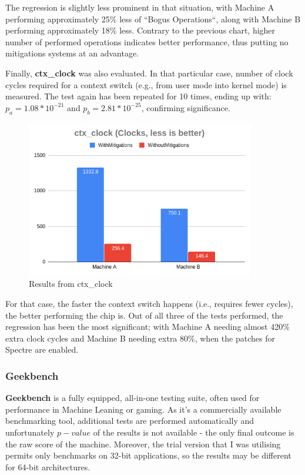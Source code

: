 \documentclass{csfourzero}
\begin{document}
The regression is slightly less prominent in that situation, with Machine A performing approximately 25\% less of ``Bogus Operations``, along with Machine B performing approximately 18\% less. Contrary to the previous chart, higher number of performed operations indicates better performance, thus putting no mitigations systems at an advantage.   

Finally, \textbf{ctx\_clock} was also evaluated. In that particular case, number of clock cycles required for a context switch (e.g., from user mode into kernel mode) is measured. The test again has been repeated for 10 times, ending up with: $p_{a} = 1.08 * 10^{-21}$ and $p_{b} = 2.81 * 10^{-25}$, confirming significance.

\begin{figure}[h]
\centering
\includegraphics[width=10cm]{ctx}
\caption{Results from ctx\_clock}
\label{fig:ctx}
\end{figure}

For that case, the faster the context switch happens (i.e., requires fewer cycles), the better performing the chip is. Out of all three of the tests performed, the regression has been the most significant; with Machine A needing almost 420\% extra clock cycles and Machine B needing extra 80\%, when the patches for Spectre are enabled.

\subsubsection{Geekbench}

\textbf{Geekbench} is a fully equipped, all-in-one testing suite, often used for performance in Machine Leaning or gaming. As it's a commercially available benchmarking tool, additional tests are performed automatically and unfortunately $p-value$ of the results is not available - the only final outcome is the raw score of the machine. Moreover, the trial version that I was utilising permits only benchmarks on 32-bit applications, so the results may be different for 64-bit architectures.
\end{document}
